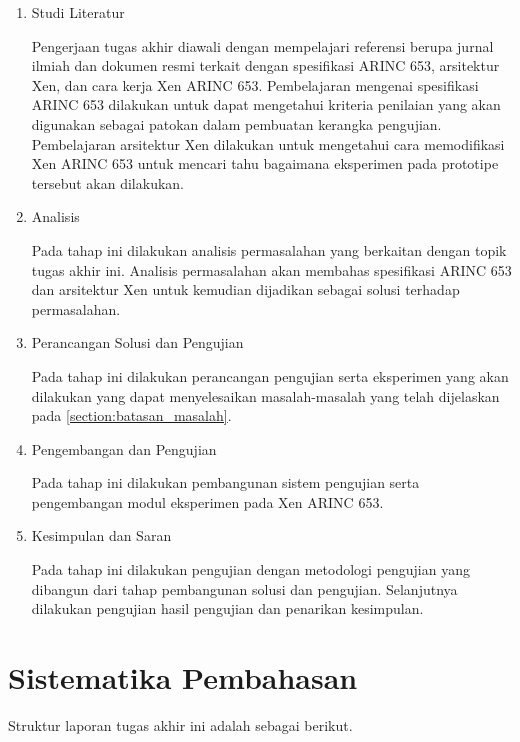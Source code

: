 \begin{enumerate}
    \item Studi Literatur

        Pengerjaan tugas akhir diawali dengan mempelajari referensi berupa jurnal ilmiah dan dokumen resmi terkait dengan spesifikasi ARINC 653, arsitektur Xen, dan cara kerja Xen ARINC 653.
        Pembelajaran mengenai spesifikasi ARINC 653 dilakukan untuk dapat mengetahui kriteria penilaian yang akan digunakan sebagai patokan dalam pembuatan kerangka pengujian.
        Pembelajaran arsitektur Xen dilakukan untuk mengetahui cara memodifikasi Xen ARINC 653 untuk mencari tahu bagaimana eksperimen pada prototipe tersebut akan dilakukan.

    \item Analisis

        Pada tahap ini dilakukan analisis permasalahan yang berkaitan dengan topik tugas akhir ini.
        Analisis permasalahan akan membahas spesifikasi ARINC 653 dan arsitektur Xen untuk kemudian dijadikan sebagai solusi terhadap permasalahan.

    \item Perancangan Solusi dan Pengujian

        Pada tahap ini dilakukan perancangan pengujian serta eksperimen yang akan dilakukan yang dapat menyelesaikan masalah\hyp{}masalah yang telah dijelaskan pada \autoref{section:batasan_masalah}.

    \item Pengembangan dan Pengujian

        Pada tahap ini dilakukan pembangunan sistem pengujian serta pengembangan modul eksperimen pada Xen ARINC 653.

    \item Kesimpulan dan Saran

        Pada tahap ini dilakukan pengujian dengan metodologi pengujian yang dibangun dari tahap pembangunan solusi dan pengujian.
        Selanjutnya dilakukan pengujian hasil pengujian dan penarikan kesimpulan.
\end{enumerate}

\section{Sistematika Pembahasan}

Struktur laporan tugas akhir ini adalah sebagai berikut.

